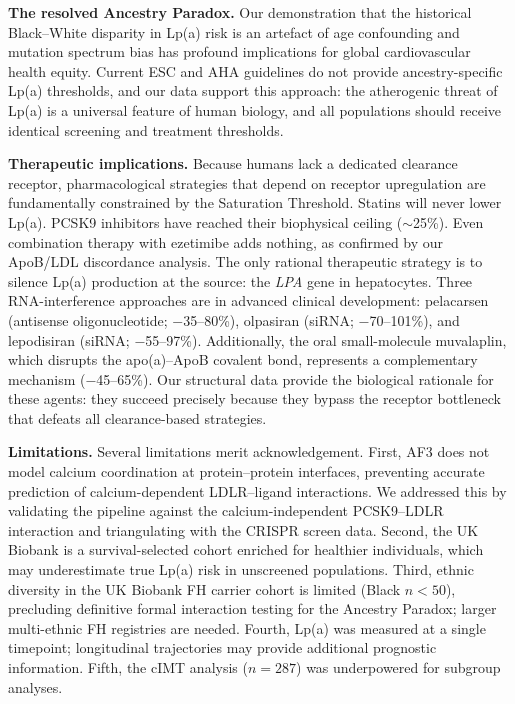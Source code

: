 \documentclass[11pt,a4paper]{article}
\newcommand{\lpa}{Lp(a)}
\newcommand{\ukb}{UK Biobank}
\begin{document}
\textbf{The resolved Ancestry Paradox.} Our demonstration that the historical Black--White disparity in \lpa{} risk is an artefact of age confounding and mutation spectrum bias has profound implications for global cardiovascular health equity. Current ESC and AHA guidelines do not provide ancestry-specific \lpa{} thresholds, and our data support this approach: the atherogenic threat of \lpa{} is a universal feature of human biology, and all populations should receive identical screening and treatment thresholds\cite{wilson2022}.

\textbf{Therapeutic implications.} Because humans lack a dedicated clearance receptor, pharmacological strategies that depend on receptor upregulation are fundamentally constrained by the Saturation Threshold. Statins will never lower \lpa{}. PCSK9 inhibitors have reached their biophysical ceiling ($\sim$25\%). Even combination therapy with ezetimibe adds nothing, as confirmed by our ApoB/LDL discordance analysis. The only rational therapeutic strategy is to silence \lpa{} production at the source: the \textit{LPA} gene in hepatocytes. Three RNA-interference approaches are in advanced clinical development: pelacarsen (antisense oligonucleotide; $-$35--80\%)\cite{tsimikas2020pelacarsen}, olpasiran (siRNA; $-$70--101\%)\cite{ohearn2023}, and lepodisiran (siRNA; $-$55--97\%)\cite{nissen2024}. Additionally, the oral small-molecule muvalaplin, which disrupts the apo(a)--ApoB covalent bond, represents a complementary mechanism ($-$45--65\%)\cite{nicholls2023}. Our structural data provide the biological rationale for these agents: they succeed precisely because they bypass the receptor bottleneck that defeats all clearance-based strategies.

\textbf{Limitations.} Several limitations merit acknowledgement. First, AF3 does not model calcium coordination at protein--protein interfaces, preventing accurate prediction of calcium-dependent LDLR--ligand interactions. We addressed this by validating the pipeline against the calcium-independent PCSK9--LDLR interaction and triangulating with the CRISPR screen data. Second, the \ukb{} is a survival-selected cohort enriched for healthier individuals, which may underestimate true \lpa{} risk in unscreened populations. Third, ethnic diversity in the \ukb{} FH carrier cohort is limited (Black $n < 50$), precluding definitive formal interaction testing for the Ancestry Paradox; larger multi-ethnic FH registries are needed. Fourth, \lpa{} was measured at a single timepoint; longitudinal trajectories may provide additional prognostic information. Fifth, the cIMT analysis ($n = 287$) was underpowered for subgroup analyses.
\end{document}
